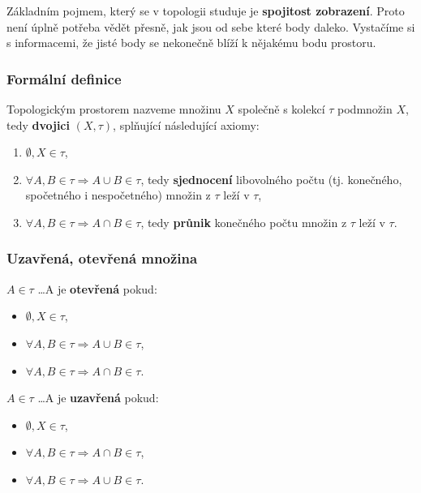 Základním pojmem, který se v topologii studuje je \textbf{spojitost zobrazení}. Proto není úplně potřeba vědět přesně, jak jsou od sebe které body daleko. Vystačíme si s informacemi, že jisté body se nekonečně blíží k nějakému bodu prostoru.

\subsubsection{Formální definice}
Topologickým prostorem nazveme množinu $X$ společně s kolekcí $\tau$ podmnožin $X$, tedy \textbf{dvojici} $(X, \tau)$, splňující následující axiomy:
\begin{enumerate}
\item $\emptyset, X \in \tau$,
\item $\forall A, B \in \tau \Rightarrow  A \cup B \in \tau $, tedy \textbf{sjednocení} libovolného počtu (tj. konečného, spočetného i nespočetného) množin z $\tau$ leží v $\tau$,
\item $\forall A, B \in \tau \Rightarrow A \cap B \in \tau $, tedy \textbf{průnik} konečného počtu množin z $\tau$ leží v $\tau$.
\end{enumerate}

\subsubsection{Uzavřená, otevřená množina}
\begin{minipage}[t]{0.49\textwidth}
$A \in \tau$ \ldots A je \textbf{otevřená} pokud:
\begin{itemize}
\item $\emptyset, X \in \tau$,
\item $\forall A, B \in \tau \Rightarrow  A \cup B \in \tau $,
\item $\forall A, B \in \tau \Rightarrow A \cap B \in \tau $.
\end{itemize}
\end{minipage}
\begin{minipage}[t]{0.49\textwidth}
$A \in \tau$ \ldots A je \textbf{uzavřená} pokud:
\begin{itemize}
\item $\emptyset, X \in \tau$,
\item $\forall A, B \in \tau \Rightarrow  A \cap B \in \tau $,
\item $\forall A, B \in \tau \Rightarrow A \cup B \in \tau $.
\end{itemize}
\end{minipage}

